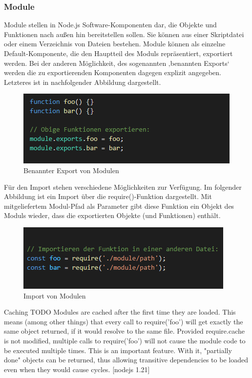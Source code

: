 \newpage
\subsubsection{Module}

Module stellen in Node.js Software-Komponenten dar, die Objekte und Funktionen nach außen hin bereitstellen sollen. Sie können aus einer Skriptdatei oder einem Verzeichnis von Dateien bestehen. Module können als einzelne Default-Komponente, die den Hauptteil des Moduls repräsentiert, exportiert werden. Bei der anderen Möglichkeit, des sogenannten ‚benannten Exports‘ werden die zu exportierenden Komponenten dagegen explizit angegeben. Letzteres ist in nachfolgender Abbildung dargestellt. 
\newline
  
\begin{figure}[h]
\centering
\includegraphics{images/nodejs_moduleExport.PNG}
\caption{Benannter Export von Modulen}
\end{figure}
 
Für den Import stehen verschiedene Möglichkeiten zur Verfügung. Im folgender Abbildung ist ein Import über die require()-Funktion dargestellt. Mit mitgeliefertem Modul-Pfad als Parameter gibt diese Funktion ein Objekt des Moduls wieder, dass die exportierten Objekte (und Funktionen) enthält.
\newline
  
\begin{figure}[h]
\centering
\includegraphics{images/nodejs_moduleImport.PNG}
\caption{Import von Modulen}
\end{figure}

Caching TODO
Modules are cached after the first time they are loaded. This means (among other things) that every call to require('foo') will get exactly the same object returned, if it would resolve to the same file.\newline
Provided require.cache is not modified, multiple calls to require('foo') will not cause the module code to be executed multiple times. This is an important feature. With it, "partially done" objects can be returned, thus allowing transitive dependencies to be loaded even when they would cause cycles. [nodejs 1.21]



